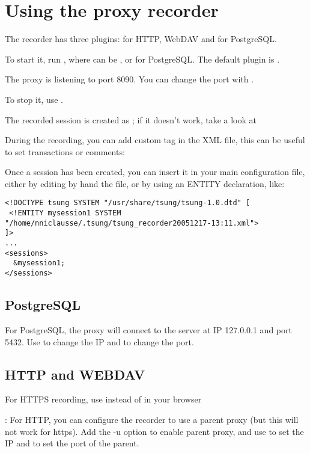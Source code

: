 \documentclass{IDXDOC-en}
\begin{document}
\section{Using the proxy recorder}


The recorder has three plugins: for HTTP, WebDAV and for PostgreSQL.

To start it, run , where  can be
,  or   for PostgreSQL. The default plugin is .


The proxy is listening to port 8090. You can change the port with
.

To stop it, use .

The recorded session is created as
; if it doesn't work,
take a look at 

During the recording, you can add custom tag in the XML file, this can
be useful to set transactions or comments:

Once a session has been created, you can insert it in your main configuration
file, either by editing by hand the file, or by using an ENTITY
declaration, like:

\begin{Verbatim}
<!DOCTYPE tsung SYSTEM "/usr/share/tsung/tsung-1.0.dtd" [
 <!ENTITY mysession1 SYSTEM "/home/nniclausse/.tsung/tsung_recorder20051217-13:11.xml">
]>
...
<sessions>
  &mysession1;
</sessions>
\end{Verbatim}

\subsection{PostgreSQL}

For PostgreSQL, the proxy will connect to the server at IP 127.0.0.1
and port 5432. Use  to change the IP and
 to change the port.

\subsection{HTTP and WEBDAV}

For HTTPS recording, use  instead of
 in your browser

: For HTTP, you can configure the recorder to
use a parent proxy (but this will not work for https). Add the -u
option to enable parent proxy, and use  to set
the IP and  to set the port of the parent.
\end{document}
